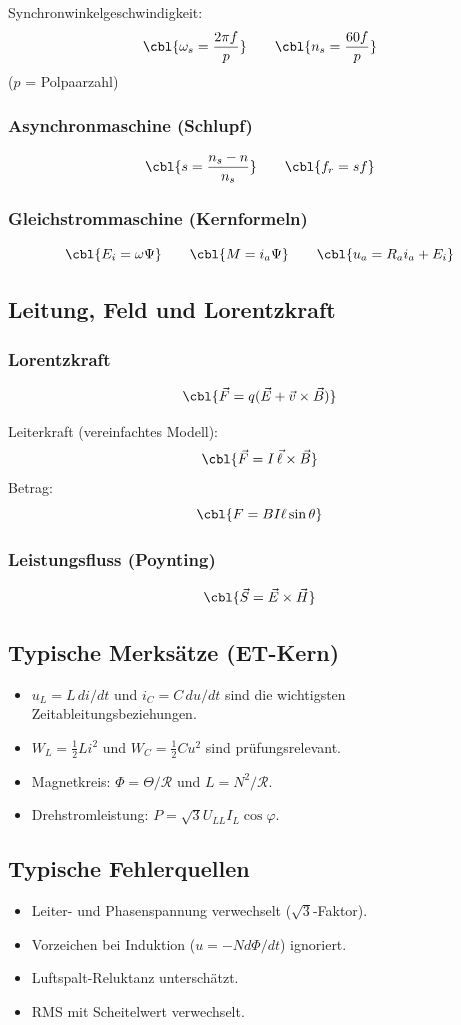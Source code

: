Synchronwinkelgeschwindigkeit:
\[
\cbl{\omega_s = \frac{2\pi f}{p}}
\qquad
\cbl{n_s = \frac{60 f}{p}}
\]
($p$ = Polpaarzahl)

\subsubsection{Asynchronmaschine (Schlupf)}

\[
\cbl{s = \frac{n_s - n}{n_s}}
\qquad
\cbl{f_r = s f}
\]

\subsubsection{Gleichstrommaschine (Kernformeln)}

\[
\cbl{E_i = \omega \Psi}
\qquad
\cbl{M = i_a \Psi}
\qquad
\cbl{u_a = R_a i_a + E_i}
\]

\subsection{Leitung, Feld und Lorentzkraft}

\subsubsection{Lorentzkraft}

\[
\cbl{\vec{F} = q(\vec{E} + \vec{v}\times \vec{B})}
\]

Leiterkraft (vereinfachtes Modell):
\[
\cbl{\vec{F} = I \, \vec{\ell} \times \vec{B}}
\]
Betrag:
\[
\cbl{F = B I \ell \sin\theta}
\]

\subsubsection{Leistungsfluss (Poynting)}

\[
\cbl{\vec{S} = \vec{E}\times \vec{H}}
\]

\subsection{Typische Merksätze (ET-Kern)}

\begin{itemize}
    \item $u_L=L\,di/dt$ und $i_C=C\,du/dt$ sind die wichtigsten Zeitableitungsbeziehungen.
    \item $W_L=\tfrac{1}{2}Li^2$ und $W_C=\tfrac{1}{2}Cu^2$ sind prüfungsrelevant.
    \item Magnetkreis: $\Phi=\Theta/\mathcal{R}$ und $L=N^2/\mathcal{R}$.
    \item Drehstromleistung: $P=\sqrt{3}U_{LL}I_L\cos\varphi$.
\end{itemize}

\subsection{Typische Fehlerquellen}

\begin{itemize}
    \item Leiter- und Phasenspannung verwechselt ($\sqrt{3}$-Faktor).
    \item Vorzeichen bei Induktion ($u=-N d\Phi/dt$) ignoriert.
    \item Luftspalt-Reluktanz unterschätzt.
    \item RMS mit Scheitelwert verwechselt.
\end{itemize}
